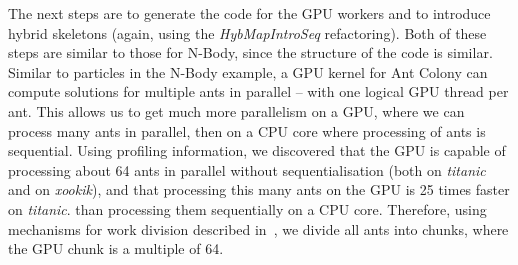 \documentclass[final]{jfp1}
\begin{document}
%

The next steps are to generate the code for the GPU
workers and to introduce hybrid skeletons (again, using the
\emph{HybMapIntroSeq} refactoring). Both of these steps are
similar to those for N-Body, since the structure of the code is
similar. Similar to particles in the N-Body example, a GPU kernel
for Ant Colony can compute solutions for multiple ants in parallel -- with one
logical GPU thread per ant.     
This allows us to get much more parallelism on a GPU, where we can process
many ants in parallel, then on a CPU core where processing of ants is 
sequential. Using profiling 
information, we discovered that the GPU is capable of processing about 64 
ants in parallel without sequentialisation (both on \emph{titanic} and on
\emph{xookik}), and that processing this many
ants on the GPU is 25 times faster on \emph{titanic}. than processing them sequentially on a
CPU core. Therefore, using mechanisms for work division described in~\cite{parco2015}, 
we divide all ants into chunks, where the GPU chunk is a multiple of 64.
\end{document}
